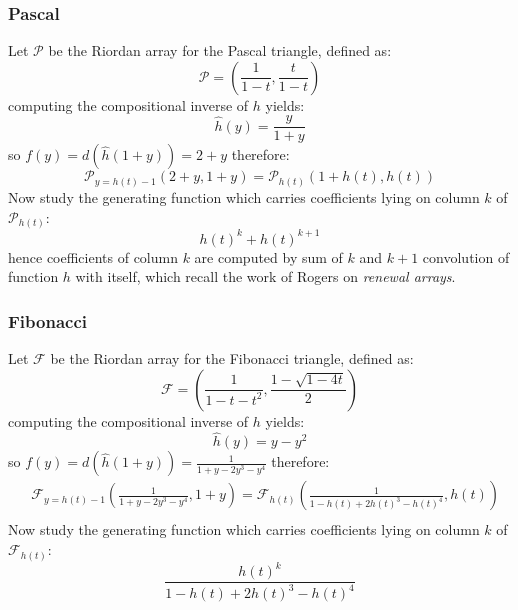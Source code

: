 \documentclass[11pt,a4paper]{article} %
\begin{document}
    \subsubsection{Pascal}
    Let $\mathcal{P}$ be the Riordan array for the Pascal triangle,
    defined as:
    \begin{displaymath} 
        \mathcal{P} = \left(\frac{1}{1-t}, \frac{t}{1-t}  \right)
    \end{displaymath} 
    computing the compositional inverse of $h$ yields:
    \begin{displaymath} 
        \hat{h}(y) = \frac{y}{1+y}
    \end{displaymath} 
    so $f(y)=d(\hat{h}(1+y))=2+y$ therefore:
    \begin{displaymath} 
        \mathcal{P}_{y=h(t)-1}\left( 2+y, 1+y \right)= \mathcal{P}_{h(t)}\left( 1+h(t), h(t) \right)
    \end{displaymath} 
    Now study the generating function which carries coefficients lying on column $k$
    of $\mathcal{P}_{h(t)}$:
    \begin{displaymath} 
        h(t)^k + h(t)^{k+1}
    \end{displaymath} 
    hence coefficients of column $k$ are computed by sum of $k$ and $k+1$ convolution 
    of function $h$ with itself, which recall the work of Rogers on \emph{renewal arrays}.

    \subsubsection{Fibonacci}
    Let $\mathcal{F}$ be the Riordan array for the Fibonacci triangle,
    defined as:
    \begin{displaymath} 
        \mathcal{F} = \left(\frac{1}{1-t-t^2}, \frac{1-\sqrt{1-4t}}{2}  \right)
    \end{displaymath} 
    computing the compositional inverse of $h$ yields:
    \begin{displaymath} 
        \hat{h}(y) = y - y^2
    \end{displaymath} 
    so $f(y)=d(\hat{h}(1+y))=\frac{1}{1+y-2y^3-y^4}$ therefore:
    \begin{displaymath} 
        \begin{split} 
            & \mathcal{F}_{y=h(t)-1}\left( \frac{1}{1+y-2y^3-y^4}, 1+y \right) = \mathcal{F}_{h(t)}\left( \frac{1}{1-h(t)+2h(t)^3-h(t)^4}, h(t) \right)\\
        \end{split} 
    \end{displaymath} 
    Now study the generating function which carries coefficients lying on column $k$
    of $\mathcal{F}_{h(t)}$:
    \begin{displaymath} 
        \frac{h(t)^k}{1-h(t)+2h(t)^3-h(t)^4}
    \end{displaymath} 
\end{document}
